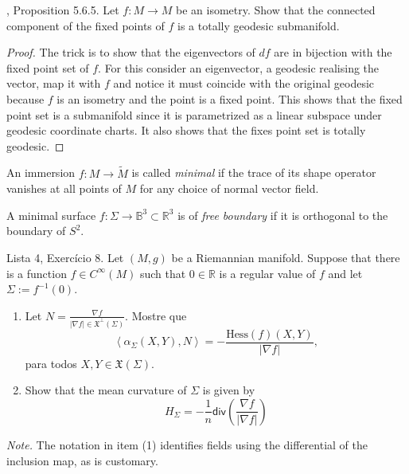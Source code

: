 \begin{exercise}
\label{exercise-fixed-point-set-isome-tota}
\cite{pet}, Proposition 5.6.5. Let $f:M\to M$
be an isometry. Show that the
connected component of the fixed points of
$f$ is a totally geodesic
submanifold.
\end{exercise}

\begin{proof}
The trick is to show that the eigenvectors of
$df$ are in bijection with the
fixed point set of $f$. For this consider an
eigenvector, a geodesic realising
the vector, map it with $f$ and notice it
must coincide with the original
geodesic because $f$ is an isometry and the
point is a fixed point. This shows
that the fixed point set is a submanifold
since it is parametrized as a linear
subspace under geodesic coordinate charts. It
also shows that the fixes point
set is totally geodesic.
\end{proof}

\begin{definition}
\label{definition-minimal-immersion}
An immersion $f:M\to\tilde{M}$ is called {\it
minimal} if the trace of its shape
operator vanishes at all points of $M$ for
any choice of normal vector field.
\end{definition}

\begin{definition}
\label{definition-minim-free-bound-immer}
A minimal surface $f:\Sigma\to
\mathbb{B}^3\subset \mathbb{R}^3$
is of {\it free boundary} if it is orthogonal
to the boundary of $S^2$.
\end{definition}

\begin{exercise}
\label{exercise-mean-curvature}
Lista 4, Exercício 8. Let $(M,g)$ be a
Riemannian manifold. Suppose that there
is a function $f \in C^\infty(M)$ such that
$0 \in \mathbb{R}$ is a regular
value of $f$ and let $\Sigma:=f^{-1}(0)$.
\begin{enumerate}
\item Let $N=\frac{\nabla f}{|\nabla f| \in
\mathfrak{X}^\perp(\Sigma)}$. Mostre
que
$$
\left\langle{}\alpha_{\Sigma}(X,Y),N\right\rangle{}=-
\frac{\text{Hess}(f)(X,Y)}{|\nabla
f|},
$$
para todos $X,Y \in \mathfrak{X}(\Sigma)$.

\item Show that the mean curvature of
$\Sigma$ is given by
$$
H_{\Sigma}=-\frac{1}{n}\mathsf{div}
\left(\frac{\nabla
f}{|\nabla f|}\right)
$$
\end{enumerate}
{\it Note.} The notation in item (1)
identifies fields using the differential of
the inclusion map, as is customary.
\end{exercise}

